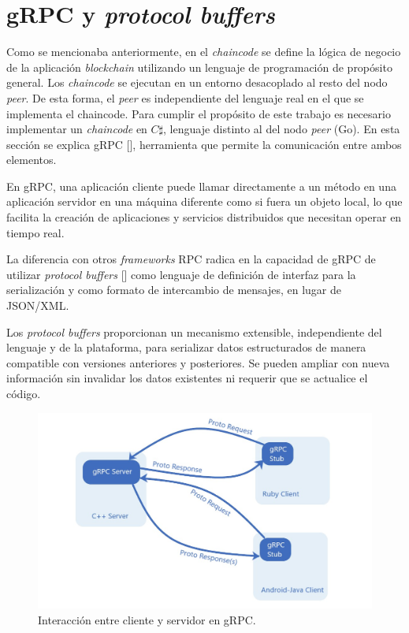 \section{gRPC y \textit{protocol buffers}}
Como se mencionaba anteriormente, en el \textit{chaincode} se define la lógica de negocio de la aplicación \textit{blockchain} utilizando un lenguaje de programación de propósito general. Los \textit{chaincode} se ejecutan en un entorno desacoplado al resto del nodo \textit{peer}. De esta forma, el \textit{peer} es independiente del lenguaje real en el que se implementa el chaincode. Para cumplir el propósito de este trabajo es necesario implementar un \textit{chaincode} en $ C\sharp$, lenguaje distinto al del nodo \textit{peer} (Go). En esta sección se explica gRPC  [\cite{grpc-doc}], herramienta que permite la comunicación entre ambos elementos. 

En gRPC, una aplicación cliente puede llamar directamente a un método en una aplicación servidor en una máquina diferente como si fuera un objeto local, lo que facilita la creación de aplicaciones y servicios distribuidos que necesitan operar en tiempo real. 


La diferencia con otros \textit{frameworks} RPC radica en la capacidad de gRPC de utilizar \textit{protocol buffers} [\cite{protobuf-doc}] como lenguaje de definición de interfaz para la serialización y como formato de intercambio de mensajes, en lugar de JSON/XML.


Los \textit{protocol buffers} proporcionan un mecanismo extensible, independiente del lenguaje y de la plataforma, para serializar datos estructurados de manera compatible con versiones anteriores y posteriores. Se pueden ampliar con nueva información sin invalidar los datos existentes ni requerir que se actualice el código.

\begin{figure}[tbph]
\centering
\includegraphics[width=\textwidth]{Images/protoserver}
\caption{ Interacción entre cliente y servidor en gRPC.}
\label{fig:grpc}
\end{figure}

